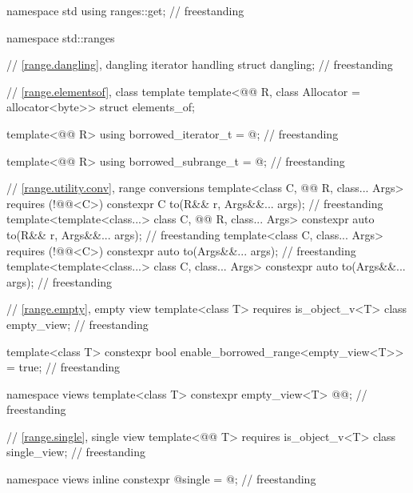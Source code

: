 \begin{codeblock}
namespace std {
  using ranges::get;                                                                // freestanding
}

namespace std::ranges {
  // \ref{range.dangling}, dangling iterator handling
  struct dangling;                                                                  // freestanding

  // \ref{range.elementsof}, class template 
  template<@@ R, class Allocator = allocator<byte>>
    struct elements_of;

  template<@@ R>
    using borrowed_iterator_t = @\seebelow@;                                          // freestanding

  template<@@ R>
    using borrowed_subrange_t = @\seebelow@;                                          // freestanding

  // \ref{range.utility.conv}, range conversions
  template<class C, @@ R, class... Args> requires (!@@<C>)
    constexpr C to(R&& r, Args&&... args);                                          // freestanding
  template<template<class...> class C, @@ R, class... Args>
    constexpr auto to(R&& r, Args&&... args);                                       // freestanding
  template<class C, class... Args> requires (!@@<C>)
    constexpr auto to(Args&&... args);                                              // freestanding
  template<template<class...> class C, class... Args>
    constexpr auto to(Args&&... args);                                              // freestanding

  // \ref{range.empty}, empty view
  template<class T>
    requires is_object_v<T>
  class empty_view;                                                                 // freestanding

  template<class T>
    constexpr bool enable_borrowed_range<empty_view<T>> = true;                     // freestanding

  namespace views {
    template<class T>
      constexpr empty_view<T> @@{};                                              // freestanding
  }

  // \ref{range.single}, single view
  template<@@ T>
    requires is_object_v<T>
  class single_view;                                                                // freestanding

  namespace views { inline constexpr @\unspecnc@ single = @\unspecnc@; }            // freestanding

}
\end{codeblock}

